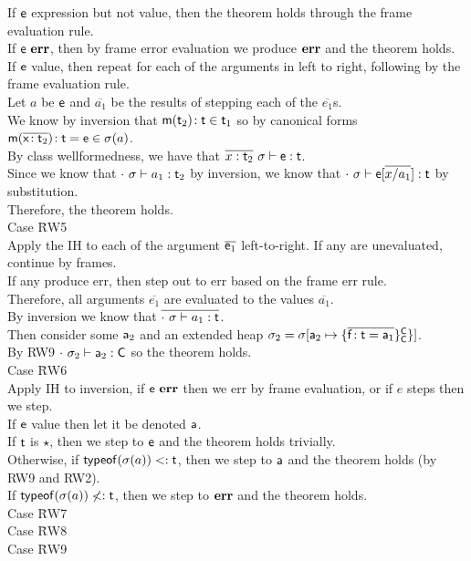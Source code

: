 \documentclass{report}
\newcommand{\m}{\M{\xt{m}}}
\newcommand{\e}{\M{\xt{e}}}
\newcommand{\f}{\M{\xt{f}}}
\newcommand{\x}{\M{\xt{x}}}
\renewcommand{\t}{\M{\xt{t}}}
\newcommand{\C}{\M{\xt{C}}}
\newcommand{\err}{\M{\bt{err}}}
\newcommand{\s}{\M{\sigma}}
\renewcommand{\a}{\M{\xt a}}
\newcommand{\tp}[1]{\M{ \t_{#1} }}
\newcommand{\ap}[1]{\M{ \a_{#1} }}
\renewcommand{\sp}[1]{\M{ \s_{#1} }}
\newcommand{\any}{\M{\star}}
\newcommand{\HT}[2]{\M{{#1}\!:{#2}}}
\newcommand{\Mdef}[5]{\M{ \HT { #1( \b{\HT{#2}{#3}})}{#4}={#5}}}
\newcommand{\Fdef}[3]{\M{ \HT{#1}{#2}={#3} }}
\newcommand{\Mtype}[3]{\M{ \HT { #1( #2 )}{#3}}}
\newcommand{\is}{\M{\mapsto}}
\newcommand{\Obj}[3]{ \M{\{ #1 \}^{#2}_{#3}}}
\newcommand{\Heap}[2]{\M{ #1[ #2 ] }}
\newcommand{\M}[1]{\ensuremath{#1}\xspace}
\newcommand{\xt}[1]{{\sf{#1}}\xspace}
\newcommand{\bt}[1]{\xt{\bf #1}}
\renewcommand{\b}[1]{\M{\overline{#1}}}
\newcommand{\Bind}[2]{\M{#1 \is #2}}
\newcommand{\Sub}{\M{<:}}
\newcommand{\typeof}[1]{\M{\xt{typeof}(#1)}}
\newcommand{\EnvType}[3]{ \M{#1 \vdash #2 : #3}}
\begin{document}
\begin{tabbing}
\> If $\e$ expression but not value, then the theorem holds through the frame evaluation rule. \\
\> If $\e~\err$, then by frame error evaluation we produce $\err$ and the theorem holds. \\
\> If $\e$ value, then repeat for each of the arguments in left to right, following by the frame evaluation rule. \\
\> Let $a$ be $\e$ and $\b{a_1}$ be the results of stepping each of the $\b{e_1}$s.\\
\> We know by inversion that $\Mtype\m{\tp2}{\t}\in\tp1$ so by canonical forms $\Mdef\m\x{\tp2}\t\e \in \s(a)$. \\
\> By class wellformedness, we have that $\EnvType{\b{x:\tp2}~\s}\e\t$.\\
\> Since we know that $\EnvType{\cdot~\s}{a_1}{\tp2}$ by inversion, we know that $\EnvType{\cdot~\s}{\e[\b{x/a_1}]}\t$ by substitution.\\
\> Therefore, the theorem holds. \\
Case \=RW5 \\
\> Apply the IH to each of the argument $\b{\e_1}$ left-to-right. If any are unevaluated, continue by frames.\\
\> If any produce err, then step out to err based on the frame err rule.\\
\> Therefore, all arguments $\b{e_1}$ are evaluated to the values $\b{a_1}$.\\
\> By inversion we know that $\b{\EnvType{\cdot~\s}{a_1}{\t}}$.\\
\> Then consider some $\ap2$ and an extended heap $\sp 2 = \Heap{\s}{ \Bind{\ap 2}{\Obj{\b{\Fdef\f\t\a_1}}\C\C\}}}$.\\
\> By RW9 $\EnvType{\cdot~\sp2}{\ap2}{\C}$ so the theorem holds.\\
Case \=RW6 \\
\> Apply IH to inversion, if $\e~\err$ then we err by frame evaluation, or if $e$ steps then we step.\\
\> If $\e$ value then let it be denoted $\a$.\\
\> If $\t$ is $\any$, then we step to $\e$ and the theorem holds trivially.\\
\> Otherwise, if $\typeof{\s(a)} \Sub \t$, then we step to $\a$ and the theorem holds (by RW9 and RW2).\\
\> If $\typeof{\s(a)}\not\Sub\t$, then we step to $\err$ and the theorem holds.\\
Case \=RW7 \\
Case \=RW8 \\
Case \=RW9 \\
\end{tabbing}
\end{document}
